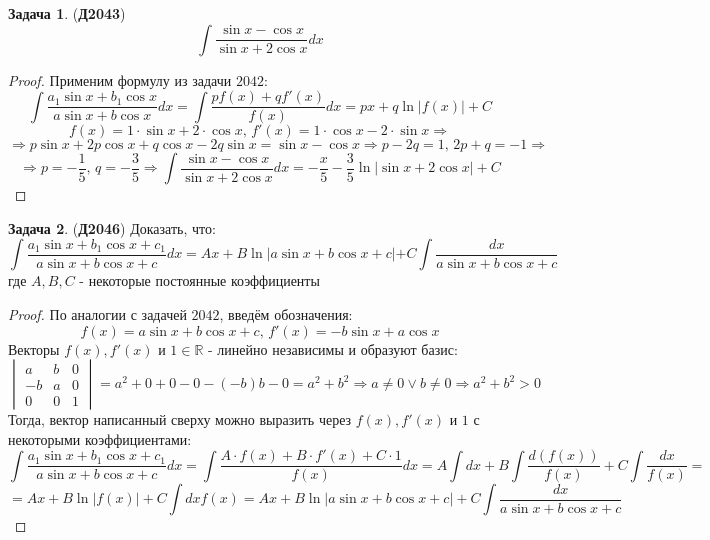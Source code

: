 \documentclass[12pt]{article}
\newcommand{\MR}{\mathbb{R}}
\theoremstyle{definition}
\newtheorem{problem}{Задача}
\DeclareMathOperator{\dint}{\displaystyle\int}
\begin{document}
\begin{problem}(\textbf{Д2043})
	$$
		\dint \dfrac{\sin{x} - \cos{x}}{\sin{x} + 2\cos{x}}dx
	$$
\end{problem}
\begin{proof}
	Применим формулу из задачи $2042$:
	$$
		\dint \dfrac{a_1 \sin{x} + b_1 \cos{x}}{a \sin{x} + b\cos{x}}dx = \dint \dfrac{pf(x) + qf'(x)}{f(x)}dx = px  + q\ln{|f(x)|} + C
	$$
	$$
		f(x) = 1{\cdot}\sin{x} + 2{\cdot}\cos{x}, \, f'(x) = 1{\cdot}\cos{x} - 2{\cdot}\sin{x} \Rightarrow 
	$$
	$$
		\Rightarrow p\sin{x} + 2p\cos{x} + q\cos{x} - 2q\sin{x} = \sin{x} - \cos{x} \Rightarrow p -2q = 1, \, 2p + q = -1 \Rightarrow 
	$$	
	$$	
		\Rightarrow p = -\dfrac{1}{5}, \, q = -\dfrac{3}{5} \Rightarrow
		\dint \dfrac{\sin{x} - \cos{x}}{\sin{x} + 2\cos{x}}dx = -\dfrac{x}{5} - \dfrac{3}{5}\ln{|\sin{x} + 2\cos{x}|} + C
	$$
\end{proof}

\begin{problem}(\textbf{Д2046})
	Доказать, что:
	$$
		\dint \dfrac{a_1 \sin{x} + b_1 \cos{x} + c_1}{a\sin{x} + b\cos{x} + c}dx = Ax + B\ln{|a\sin{x} + b\cos{x} + c}| + C\dint\dfrac{dx}{a\sin{x} + b\cos{x} + c}
	$$
	где $A, B,C$ - некоторые постоянные коэффициенты
\end{problem}
\begin{proof}
	По аналогии с задачей $2042$, введём обозначения:
	$$
		f(x) = a\sin{x} + b\cos{x} + c, \, f'(x) = -b\sin{x} + a\cos{x}
	$$
	Векторы $f(x), f'(x)$ и $1 \in \MR$ - линейно независимы и образуют базис:
	$$
		\begin{vmatrix}
			a & b & 0 \\
			-b & a & 0 \\
			0 & 0 & 1
		\end{vmatrix} = a^2 + 0 + 0 - 0 - (-b)b - 0 = a^2 + b^2\Rightarrow a \neq 0 \vee b \neq 0 \Rightarrow a^2 + b^2 > 0
	$$
	Тогда, вектор написанный сверху можно выразить через $f(x), f'(x)$ и $1$ с некоторыми коэффициентами:
	$$
		\dint \dfrac{a_1 \sin{x} + b_1 \cos{x} + c_1}{a\sin{x} + b\cos{x} + c}dx = \dint \dfrac{A{\cdot}f(x) + B{\cdot}f'(x) + C{\cdot}1}{f(x)}dx = A\dint dx + B\dint \dfrac{d(f(x))}{f(x)} + C\dint\dfrac{dx}{f(x)} = 
	$$
	$$
		= Ax + B\ln{|f(x)|} + C\dint{dx}{f(x)} = Ax + B\ln{|a\sin{x} + b\cos{x} + c|} + C \dint \dfrac{dx}{a\sin{x} + b\cos{x} + c}
	$$
\end{proof}
\end{document}
